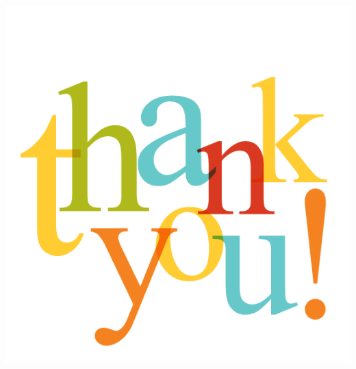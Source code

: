 \documentclass{beamer}
\begin{document}
\section{}
\begin{frame}
    \centering
    \includegraphics[scale=0.3]{images/thankyou}
\end{frame}
\end{document}
